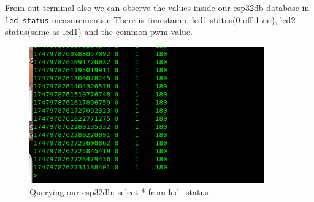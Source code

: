\documentclass[a4paper,12pt]{article}
\begin{document}
	From out terminal also we can observe the values inside our esp32db database in \texttt{led\_status} measurements.c
	There is timestamp, led1 status(0-off 1-on), led2 status(same as led1) and the common pwm value.
	\begin{figure}[H]
			\centering
			\includegraphics[width=0.9\textwidth]{influx.png}
			\caption{Querying our esp32db: select * from led\_status}
			\label{fig1:}
		\end{figure}		
\end{document}
